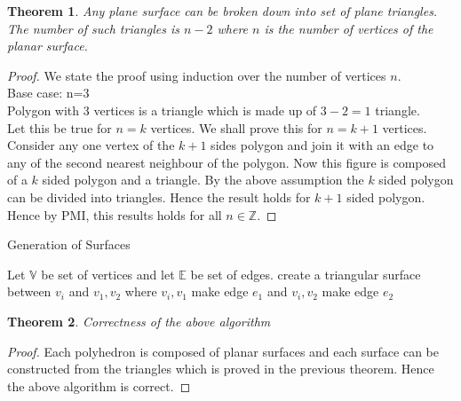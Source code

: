 \documentclass[12pt]{article}
\newtheorem{theorem}{Theorem}
\begin{document}
    \begin{theorem}
        Any plane surface can be broken down into set of plane triangles. The number of such triangles is $n-2$ where $n$ is the number of vertices of the planar surface.
    \end{theorem}
    \begin{proof}
        We state the proof using induction over the number of vertices $n$.\\
        Base case: n=3\\
        Polygon with 3 vertices is a triangle which is made up of $3-2 = 1$ triangle.\\
        Let this be true for $n=k$ vertices. We shall prove this for $n=k+1$ vertices.\\
        Consider any one vertex of the $k+1$ sides polygon and join it with an edge to any of the second nearest neighbour of the polygon. Now this figure is composed of a $k$ sided polygon and a triangle. By the above assumption the $k$ sided polygon can be divided into triangles. Hence the result holds for $k+1$ sided polygon. Hence by PMI, this results holds for all $n\in \mathbb{Z}$.
    \end{proof}

    \begin{algorithm}
        \caption{Generation of Surfaces}
        \begin{algorithmic}
            \STATE Let $\mathbb{V}$ be set of vertices and let $\mathbb{E}$ be set of edges.
                    \STATE create a triangular surface between $v_i$ and $v_1,v_2$ where $v_i,v_1$ make edge $e_1$ and $v_i,v_2$ make edge $e_2$ 
                \ENDFOR
            \ENDFOR
        \end{algorithmic}
    \end{algorithm}
    
    \begin{theorem}
        Correctness of the above algorithm
    \end{theorem}
    \begin{proof}
        Each polyhedron is composed of planar surfaces and each surface can be constructed from the triangles which is proved in the previous theorem. Hence the above algorithm is correct.
    \end{proof}
    
\end{document}

